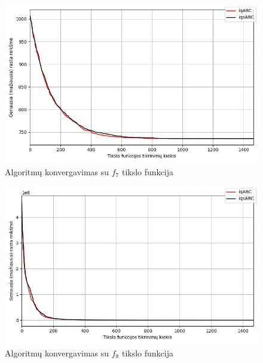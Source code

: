 \documentclass{VUMIFKompMagistrinis}
\begin{document}
\begin{landscape}
\begin{multicols}{2}
\begin{figure}[H]
    \centering
    \includegraphics[scale=0.5]{img/2kg/f7.jpg}
    \caption{Algoritmų konvergavimas su $f_{7}$ tikslo funkcija}
    \label{img:vkonf7}
\end{figure}


\begin{figure}[H]
    \centering
    \includegraphics[scale=0.5]{img/2kg/f8.jpg}
    \caption{Algoritmų konvergavimas su $f_{8}$ tikslo funkcija}
    \label{img:vkonf8}
\end{figure}



\end{multicols}
\begin{multicols}{2}



\end{multicols}
\end{landscape}
\end{document}
